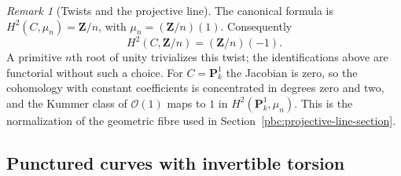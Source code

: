 \documentclass[11pt,a4paper]{article}
\numberwithin{equation}{section}
\theoremstyle{definition}
\theoremstyle{remark}
\newtheorem{remark}[theorem]{Remark}
\newcommand{\cO}{\mathcal O}
\newcommand{\Z}{\mathbf Z}
\newcommand{\PP}{\mathbf P}
\begin{document}
\begin{remark}[Twists and the projective line]
\label{app:curve-twists}
The canonical formula is $H^2(C,\mu_n)=\Z/n$, with
$\mu_n=(\Z/n)(1)$.  Consequently
\[
 H^2(C,\Z/n)=(\Z/n)(-1).
\]
A primitive $n$th root of unity trivializes this twist; the
identifications above are functorial without such a choice.  For
$C=\PP^1_k$ the Jacobian is zero, so the cohomology with constant
coefficients is concentrated in degrees zero and two, and the Kummer
class of $\cO(1)$ maps to $1$ in $H^2(\PP^1_k,\mu_n)$.  This is the
normalization of the geometric fibre used in
Section~\ref{pbc:projective-line-section}.
\end{remark}

\subsection{Punctured curves with invertible torsion}
\end{document}
